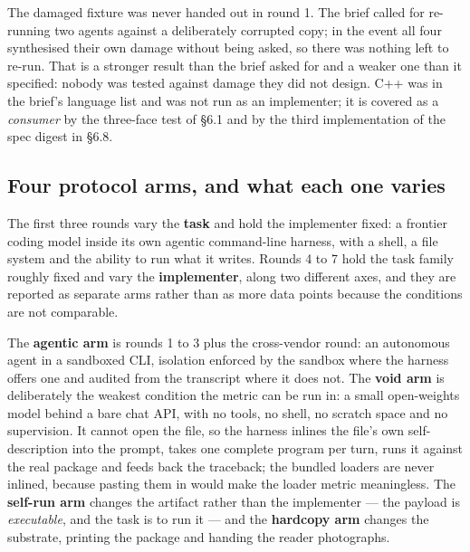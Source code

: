 \documentclass[10pt,twocolumn,letterpaper]{article}
\begin{document}
The damaged fixture was never handed out in round 1. The brief called for re-running two agents against a deliberately corrupted copy; in the event all four synthesised their own damage without being asked, so there was nothing left to re-run. That is a stronger result than the brief asked for and a weaker one than it specified: nobody was tested against damage they did not design. C++ was in the brief's language list and was not run as an implementer; it is covered as a \emph{consumer} by the three-face test of \S6.1 and by the third implementation of the spec digest in \S6.8.

\subsection{Four protocol arms, and what each one varies}

The first three rounds vary the \textbf{task} and hold the implementer fixed: a frontier coding model inside its own agentic command-line harness, with a shell, a file system and the ability to run what it writes. Rounds 4 to 7 hold the task family roughly fixed and vary the \textbf{implementer}, along two different axes, and they are reported as separate arms rather than as more data points because the conditions are not comparable.

The \textbf{agentic arm} is rounds 1 to 3 plus the cross-vendor round: an autonomous agent in a sandboxed CLI, isolation enforced by the sandbox where the harness offers one and audited from the transcript where it does not. The \textbf{void arm} is deliberately the weakest condition the metric can be run in: a small open-weights model behind a bare chat API, with no tools, no shell, no scratch space and no supervision. It cannot open the file, so the harness inlines the file's own self-description into the prompt, takes one complete program per turn, runs it against the real package and feeds back the traceback; the bundled loaders are never inlined, because pasting them in would make the loader metric meaningless. The \textbf{self-run arm} changes the artifact rather than the implementer --- the payload is \emph{executable}, and the task is to run it --- and the \textbf{hardcopy arm} changes the substrate, printing the package and handing the reader photographs.
\end{document}
